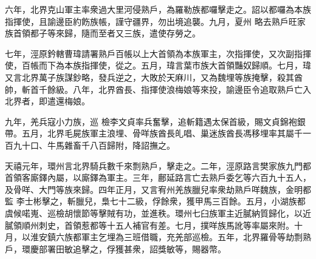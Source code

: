 \begin{pinyinscope}
 六年，北界克山軍主率衆過大里河侵熟戶，為羅勒族都囉擊走之。詔以都囉為本族指揮使，且諭邊臣約飭族帳，謹守疆界，勿出境追襲。九月，夏州
 略去熟戶旺家族首領都子等來歸，隨而至者又三族，遣使存勞之。



 七年，涇原鈐轄曹瑋請署熟戶百帳以上大首領為本族軍主，次指揮使，又次副指揮使，百帳而下為本族指揮使，從之。五月，瑋言葉市族大首領豔奴歸順。七月，瑋又言北界萬子族謀鈔略，發兵逆之，大敗於天麻川，又為魏埋等族掩擊，殺其酋帥，斬首千餘級。八年，北界酋長、指揮使浪梅娘等來投，諭邊臣令追取熟戶亡入北界者，即遣還梅娘。



 九年，羌兵寇小力族，巡
 檢李文貞率兵奮擊，追斬籍遇太保首級，賜文貞錦袍銀帶。五月，北界毛屍族軍主浪埋、骨咩族酋長癿唱、巢迷族酋長馮移埋率其屬千一百九十口、牛馬雜畜千八百歸附，降詔撫之。



 天禧元年，環州言北界騎兵數千來剽熟戶，擊走之。二年，涇原路言樊家族九門都首領客廝鐸內屬，以廝鐸為軍主。三年，鄜延路言亡去熟戶委乞等六百九十五人，及骨咩、大門等族來歸。四年正月，又言宥州羌族臘兒率衆劫熟戶咩魏族，金明都監
 李士彬擊之，斬臘兒，梟七十二級，俘餘衆，獲甲馬三百餘。五月，小湖族都虞候喏嵬、巡檢胡懷節等擊賊有功，並進秩。環州七臼族軍主近膩納質歸化，以近膩領順州刺史，首領惹都等十五人補官有差。七月，撲咩族馬訛等率屬來附。十月，以淮安鎮六族都軍主乞埋為三班借職，充羌部巡檢。五年，北界羅骨等劫剽熟戶，環慶部署田敏追擊之，俘獲甚衆，詔獎敏等，賜器幣。



\end{pinyinscope}
